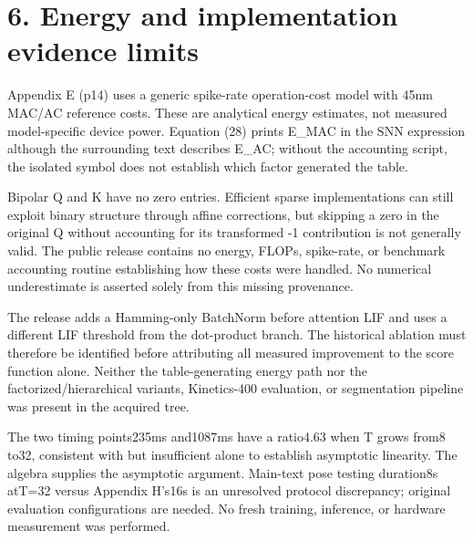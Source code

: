 \documentclass[10pt]{article}
\begin{document}
\section*{6. Energy and implementation evidence limits}
Appendix E (p14) uses a generic spike-rate operation-cost model with 45nm MAC/AC reference costs. These are analytical energy estimates, not measured model-specific device power. Equation (28) prints E\_MAC in the SNN expression although the surrounding text describes E\_AC; without the accounting script, the isolated symbol does not establish which factor generated the table.\par
Bipolar Q and K have no zero entries. Efficient sparse implementations can still exploit binary structure through affine corrections, but skipping a zero in the original Q without accounting for its transformed -1 contribution is not generally valid. The public release contains no energy, FLOPs, spike-rate, or benchmark accounting routine establishing how these costs were handled. No numerical underestimate is asserted solely from this missing provenance.\par
The release adds a Hamming-only BatchNorm before attention LIF and uses a different LIF threshold from the dot-product branch. The historical ablation must therefore be identified before attributing all measured improvement to the score function alone. Neither the table-generating energy path nor the factorized/hierarchical variants, Kinetics-400 evaluation, or segmentation pipeline was present in the acquired tree.\par
The two timing points235ms and1087ms have a ratio4.63 when T grows from8 to32, consistent with but insufficient alone to establish asymptotic linearity. The algebra supplies the asymptotic argument. Main-text pose testing duration8s atT=32 versus Appendix H’s16s is an unresolved protocol discrepancy; original evaluation configurations are needed. No fresh training, inference, or hardware measurement was performed.\par
\end{document}
